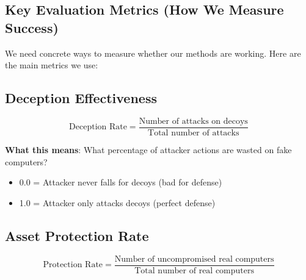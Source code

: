 \documentclass[11pt]{article}
\begin{document}
\begin{intuition}


\section{Key Evaluation Metrics (How We Measure Success)}

\begin{foundation}
We need concrete ways to measure whether our methods are working. Here are the main metrics we use:
\end{foundation}

\subsection{Deception Effectiveness}
\begin{mathdetails}
$$\text{Deception Rate} = \frac{\text{Number of attacks on decoys}}{\text{Total number of attacks}}$$

\textbf{What this means}: What percentage of attacker actions are wasted on fake computers?
\begin{itemize}
\item 0.0 = Attacker never falls for decoys (bad for defense)
\item 1.0 = Attacker only attacks decoys (perfect defense)
\end{itemize}
\end{mathdetails}

\subsection{Asset Protection Rate}
\begin{mathdetails}
$$\text{Protection Rate} = \frac{\text{Number of uncompromised real computers}}{\text{Total number of real computers}}$$


\end{mathdetails}
\end{intuition}
\end{document}
